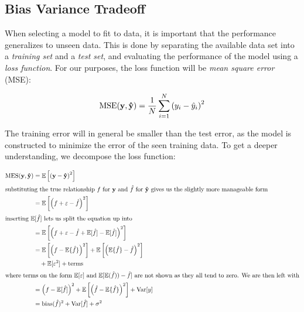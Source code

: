 \subsection{Bias Variance Tradeoff}\label{sec:bias-vari-trad} 

When selecting a model to fit to data, it is important that the performance
generalizes to unseen data. This is done by separating the available data set
into a \textit{training set} and a \textit{test set}, and evaluating the
performance of the model using a \textit{loss function}. For our purposes, the
loss function will be \textit{mean square error} (MSE):

\begin{equation*}
  \text{MSE}(\vb{y}, \vb{\hat{y}}) = \frac{1}{N}\sum_{i=1}^{N}\left( y_{i} - \hat{y}_{i} \right)^{2}
\end{equation*}

The training error will in general be smaller than the test error, as the model
is constructed to minimize the error of the seen training data. To get a deeper
understanding, we decompose the loss function:

\begin{align*}
  \text{MES}(\vb{y}, \vb{\hat{y}}) &= \operatorname{\mathbb{E}}\left[ \left( \vb{y} - \vb{\hat{y}} \right)^{2} \right]\\
  \intertext{substituting the true relationship \(f\) for \(\vb{y}\) and \(\hat f\) for \(\vb{\hat{y}}\)
  gives us the slightly more manageable form}
  &= \operatorname{\mathbb{E}}\left[ \left( f + \varepsilon - \hat f \right)^{2} \right]\\
    \intertext{inserting \(\operatorname{\mathbb{E}}[\hat f]\) lets us split the equation up into}
  &= \operatorname{\mathbb{E}}\left[ \left( f + \varepsilon - \hat f + \operatorname{\mathbb{E}}[\hat f] - \operatorname{\mathbb{E}}[\hat f] \right)^{2} \right]\\
                                   &= \operatorname{\mathbb{E}}\left[\left( f - \operatorname{\mathbb{E}}\{\hat f\} \right)^{2}\right] + \operatorname{\mathbb{E}}\left[ \left( \operatorname{\mathbb{E}}\{\hat f\} - \hat f \right)^{2} \right]\\
  &\quad + \operatorname{\mathbb{E}}[\varepsilon^{2}] + \text{terms}\\
  \intertext{where terms on the form \(\operatorname{\mathbb{E}}[\varepsilon]\) and \(\operatorname{\mathbb{E}}[\operatorname{\mathbb{E}}(\hat f)) - \hat f]\) are not shown as they all tend to zero. We are then left with}
                                   &= \left( f - \operatorname{\mathbb{E}}[\hat f] \right)^{2} + \operatorname{\mathbb{E}}\left[\left(\hat f - \operatorname{\mathbb{E}}\{\hat f\}  \right)^{2}\right] + \text{Var}[y]\\
  &= \text{bias}(\hat f)^{2} + \text{Var}[\hat f]  + \sigma^{2}
\end{align*}

